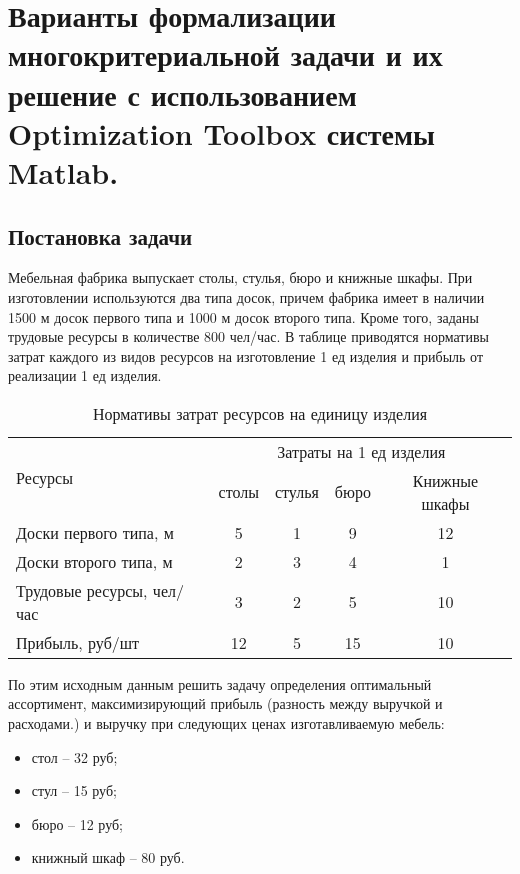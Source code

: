 \newpage
\section{Варианты формализации многокритериальной задачи и их решение с использованием Optimization Toolbox  системы Matlab.}


\subsection{Постановка задачи}
Мебельная  фабрика выпускает столы, стулья, бюро и книжные шкафы. При изготовлении используются два типа досок, причем фабрика имеет в наличии 1500 м досок первого типа и 1000 м досок второго типа. Кроме того, заданы трудовые ресурсы в количестве 800 чел/час. В таблице приводятся нормативы затрат каждого из видов ресурсов на изготовление 1 ед изделия и прибыль от реализации 1  ед  изделия.

\begin{table}[htb]
	\begin{tabularx}{\textwidth}{|X|c|c|c|c|}
	\hline 
	\multirow{2}{*}{Ресурсы} & \multicolumn{4}{c|}{Затраты на 1 ед изделия} \\ 
	\hhline{~----}
	{} & столы & стулья & бюро & Книжные шкафы \\ 
	\hline 
	Доски первого типа, м & 5 & 1 & 9 & 12 \\ 
	\hline 
	Доски второго типа, м & 2 & 3 & 4 & 1 \\ 
	\hline 
	Трудовые ресурсы, чел/час & 3 & 2 & 5 & 10 \\ 
	\hline 
	Прибыль, руб/шт & 12 & 5 & 15 & 10 \\ 
	\hline 
	\end{tabularx} 
\caption{Нормативы затрат ресурсов на единицу изделия}
\end{table}

По этим исходным данным решить задачу определения оптимальный ассортимент, максимизирующий прибыль (разность между выручкой и расходами.) и выручку при следующих ценах изготавливаемую мебель:

\begin{itemize}
\item стол -- 32 руб;
\item стул -- 15 руб;
\item бюро -- 12 руб;
\item книжный шкаф -- 80 руб.
\end{itemize}


